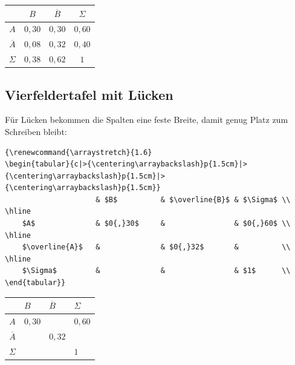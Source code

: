 \begin{ausgabe}
\centering
{\renewcommand{\arraystretch}{1.6}
\begin{tabular}{c|c|c|c}
	                 & $B$          & $\overline{B}$ & $\Sigma$ \\ \hline
	$A$              & $0{,}30$     & $0{,}30$       & $0{,}60$ \\ \hline
	$\overline{A}$   & $0{,}08$     & $0{,}32$       & $0{,}40$ \\ \hline
	$\Sigma$         & $0{,}38$     & $0{,}62$       & $1$      \\
\end{tabular}}
\end{ausgabe}


\subsection{Vierfeldertafel mit Lücken}

Für Lücken bekommen die Spalten eine feste Breite, damit genug Platz zum Schreiben bleibt:

\begin{lstlisting}[style=latex]
{\renewcommand{\arraystretch}{1.6}
\begin{tabular}{c|>{\centering\arraybackslash}p{1.5cm}|>{\centering\arraybackslash}p{1.5cm}|>{\centering\arraybackslash}p{1.5cm}}
	                 & $B$          & $\overline{B}$ & $\Sigma$ \\ \hline
	$A$              & $0{,}30$     &                & $0{,}60$ \\ \hline
	$\overline{A}$   &              & $0{,}32$       &          \\ \hline
	$\Sigma$         &              &                & $1$      \\
\end{tabular}}
\end{lstlisting}

\begin{ausgabe}
\centering
{\renewcommand{\arraystretch}{1.6}
\begin{tabular}{c|>{\centering\arraybackslash}p{1.5cm}|>{\centering\arraybackslash}p{1.5cm}|>{\centering\arraybackslash}p{1.5cm}}
	                 & $B$          & $\overline{B}$ & $\Sigma$ \\ \hline
	$A$              & $0{,}30$     &                & $0{,}60$ \\ \hline
	$\overline{A}$   &              & $0{,}32$       &          \\ \hline
	$\Sigma$         &              &                & $1$      \\
\end{tabular}}
\end{ausgabe}



